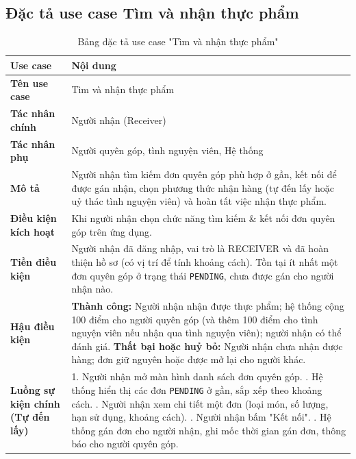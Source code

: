 \documentclass[../main.tex]{subfiles}%
\begin{document}
\subsection{Đặc tả use case Tìm và nhận thực phẩm}
\label{section:2.4.2}

\begingroup
\renewcommand{\arraystretch}{1.45}
\begin{longtable}{|p{3.5cm}|p{11.5cm}|}
\caption{Bảng đặc tả use case "Tìm và nhận thực phẩm"}
\label{tab:usecase_tim_va_nhan_thuc_pham}\\
\hline
\textbf{Use case} & \textbf{Nội dung} \\ \hline
\textbf{Tên use case} & Tìm và nhận thực phẩm \\ \hline
\textbf{Tác nhân chính} & Người nhận (Receiver) \\ \hline
\textbf{Tác nhân phụ} & Người quyên góp, tình nguyện viên, Hệ thống \\ \hline
\textbf{Mô tả} & Người nhận tìm kiếm đơn quyên góp phù hợp ở gần, kết nối để được gán nhận, chọn phương thức nhận hàng (tự đến lấy hoặc uỷ thác tình nguyện viên) và hoàn tất việc nhận thực phẩm. \\ \hline
\textbf{Điều kiện kích hoạt} & Khi người nhận chọn chức năng tìm kiếm \& kết nối đơn quyên góp trên ứng dụng. \\ \hline
\textbf{Tiền điều kiện} & Người nhận đã đăng nhập, vai trò là RECEIVER và đã hoàn thiện hồ sơ (có vị trí để tính khoảng cách). Tồn tại ít nhất một đơn quyên góp ở trạng thái \texttt{PENDING}, chưa được gán cho người nhận nào. \\ \hline
\textbf{Hậu điều kiện} &
\textbf{Thành công:} Người nhận nhận được thực phẩm; hệ thống cộng 100 điểm cho người quyên góp (và thêm 100 điểm cho tình nguyện viên nếu nhận qua tình nguyện viên); người nhận có thể đánh giá. \newline
\textbf{Thất bại hoặc huỷ bỏ:} Người nhận chưa nhận được hàng; đơn giữ nguyên hoặc được mở lại cho người khác. \\ \hline
\textbf{Luồng sự kiện chính (Tự đến lấy)} &
1. Người nhận mở màn hình danh sách đơn quyên góp. \newline
2. Hệ thống hiển thị các đơn \texttt{PENDING} ở gần, sắp xếp theo khoảng cách. \newline
3. Người nhận xem chi tiết một đơn (loại món, số lượng, hạn sử dụng, khoảng cách). \newline
4. Người nhận bấm "Kết nối". \newline
5. Hệ thống gán đơn cho người nhận, ghi mốc thời gian gán đơn, thông báo cho người quyên góp. \newline

\end{longtable}
\end{document}
